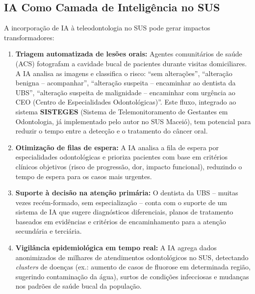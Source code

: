 
\subsection{IA Como Camada de Inteligência no SUS}

A incorporação de IA à teleodontologia no SUS pode gerar impactos
transformadores:

\begin{enumerate}
  \item \textbf{Triagem automatizada de lesões orais:} Agentes comunitários de
    saúde (ACS) fotografam a cavidade bucal de pacientes durante visitas
    domiciliares. A IA analisa as imagens e classifica o risco: ``sem
    alterações'', ``alteração benigna -- acompanhar'', ``alteração suspeita --
    encaminhar ao dentista da UBS'', ``alteração suspeita de malignidade --
    encaminhar com urgência ao CEO (Centro de Especialidades Odontológicas)''.
    Este fluxo, integrado ao sistema \textbf{SISTEGES} (Sistema de
    Telemonitoramento de Gestantes em Odontologia, já implementado pelo autor
    no SUS Maceió), tem potencial para reduzir o tempo entre a detecção e o
    tratamento do câncer oral.

  \item \textbf{Otimização de filas de espera:} A IA analisa a fila de espera
    por especialidades odontológicas e prioriza pacientes com base em critérios
    clínicos objetivos (risco de progressão, dor, impacto funcional), reduzindo
    o tempo de espera para os casos mais urgentes.

  \item \textbf{Suporte à decisão na atenção primária:} O dentista da UBS --
    muitas vezes recém-formado, sem especialização -- conta com o suporte de um
    sistema de IA que sugere diagnósticos diferenciais, planos de tratamento
    baseados em evidências e critérios de encaminhamento para a atenção
    secundária e terciária.

  \item \textbf{Vigilância epidemiológica em tempo real:} A IA agrega dados
    anonimizados de milhares de atendimentos odontológicos no SUS, detectando
    \textit{clusters} de doenças (ex.: aumento de casos de fluorose em
    determinada região, sugerindo contaminação da água), surtos de condições
    infecciosas e mudanças nos padrões de saúde bucal da população.
\end{enumerate}

